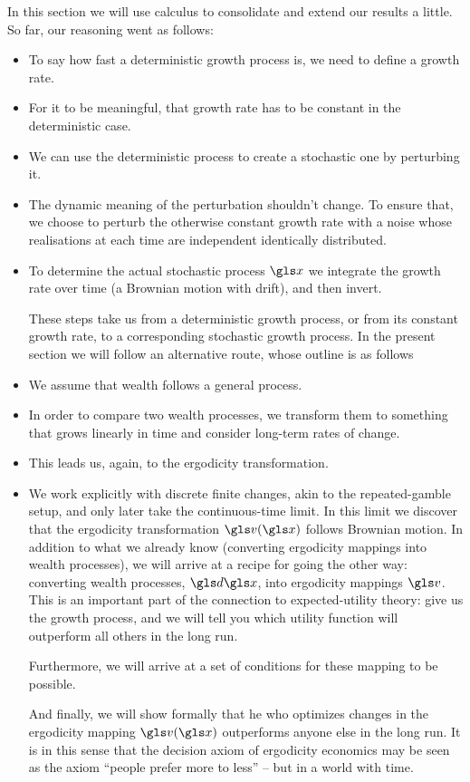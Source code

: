 In this section we will use \Ito calculus to consolidate and extend our results a little. So far, our reasoning went as follows:
\begin{itemize}
\item
To say how fast a deterministic growth process is, we need to define a growth rate.
\item
For it to be meaningful, that growth rate has to be constant in the deterministic case.
\item
We can use the deterministic process to create a stochastic one by perturbing it.
\item
The dynamic meaning of the perturbation shouldn't change. To ensure that, we choose to 
perturb the otherwise constant growth rate with a noise whose realisations at each time 
are independent identically distributed.
\item
To determine the actual stochastic process $\x$ we integrate the growth rate over time 
(a Brownian motion with drift), and then invert.
\ei

These steps take us from a deterministic growth process, or from its constant growth rate, 
to a corresponding stochastic growth process.
In the present section we will follow an alternative route, whose outline is as follows
\bi
\item
We assume that wealth follows a general \Ito process.
\item
In order to compare two wealth processes, we transform them to something that grows linearly in time and consider long-term rates of change.
\item
This leads us, again, to the ergodicity transformation. 
\item
We work explicitly with discrete finite changes, 
akin to the repeated-gamble setup, and only later take the continuous-time limit.
In this limit we discover that the ergodicity transformation $\gv(\x)$ follows Brownian motion.
\ei
In addition to what we already know (converting ergodicity mappings into wealth processes), we will 
arrive at a recipe for going the other way: converting wealth processes, $\gd\x$, into ergodicity mappings 
$\gv$. This is an important part of the connection to expected-utility theory: give us the growth process, 
and we will tell you which utility function will outperform all others in the long run.

Furthermore, we will arrive at a set of conditions for these mapping to be possible.

And finally, we will show formally that he who optimizes changes in the ergodicity mapping $\gv(\x)$ outperforms 
anyone else in the long run. It is in this sense that the decision axiom of ergodicity economics may be seen as 
the axiom ``people prefer more to less'' -- but in a world with time.


\end{itemize}
